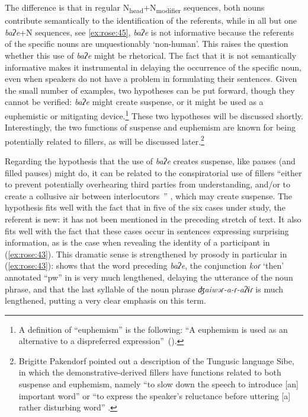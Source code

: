 \documentclass[output=paper]{langscibook}
\begin{document}
The difference is that in regular N\textsubscript{head}+N\textsubscript{modifier} sequences, both nouns contribute semantically to the identification of the referents, while in all but one \textit{baʔe}+N sequences, see \ref{ex:rose:45}, \textit{baʔe} is not informative because the referents of the specific nouns are unquestionably ‘non-human’. This raises the question whether this use of \textit{baʔe} might be rhetorical. The fact that it is not semantically informative makes it instrumental in delaying the occurrence of the specific noun, even when speakers do not have a problem in formulating their sentences. Given the small number of examples, two hypotheses can be put forward, though they cannot be verified: \textit{baʔe} might create suspense, or it might be used as a euphemistic or mitigating device.\footnote{A definition of “euphemism” is the following: “A euphemism is used as an alternative to a dispreferred expression”~(\citealt[11]{AllanAllan1991}).} These two hypotheses will be discussed shortly. Interestingly, the two functions of suspense and euphemism are known for being potentially related to fillers, as will be discussed later.\footnote{Brigitte Pakendorf pointed out a description of the Tungusic language Sibe, in which the demonstrative-derived fillers have functions related to both suspense and euphemism, namely “to slow down the speech to introduce [an] important word” or “to express the speaker’s reluctance before uttering [a] rather disturbing word” \citep[106--107]{Zikmundová2013}.}  

Regarding the hypothesis that the use of \textit{baʔe} creates suspense, like pauses (and filled pauses) might do, it can be related to the conspiratorial use of fillers “either to prevent potentially overhearing third parties from understanding, and/or to create a collusive air between interlocutors~”  \citep[106]{Enfield2003}, which may create suspense. The hypothesis fits well with the fact that in five of the six cases under study, the referent is new: it has not been mentioned in the preceding stretch of text. It also fits well with the fact that these cases occur in sentences expressing surprising information, as is the case when revealing the identity of a participant in (\ref{ex:rose:43}). This dramatic sense is strengthened by prosody in particular in (\ref{ex:rose:43}):  shows that the word preceding \textit{baʔe}, the conjunction \textit{koɾ} ‘then’ annotated “pw” in  is very much lengthened, delaying the utterance of the noun phrase, and that the last syllable of the noun phrase \textit{ʤaiwəɾ-a-ɾ{}-aʔɨɾ} is much lengthened, putting a very clear emphasis on this term. 
\end{document}

